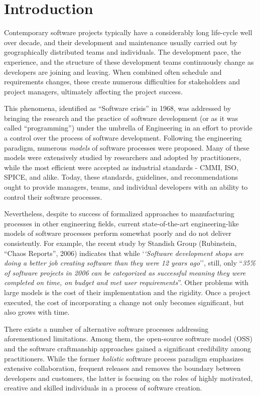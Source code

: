 \chapter{Introduction}
Contemporary software projects typically have a considerably long life-cycle well over decade, 
and their development and maintenance usually carried out by geographically distributed teams 
and individuals. The development pace, the experience, and the structure of these development 
teams continuously change as developers are joining and leaving. When combined 
often schedule and requirements changes, these create numerous difficulties for stakeholders
and project managers, ultimately affecting the project success. 

This phenomena, identified as ``Software crisis'' in 1968, was addressed by 
bringing the research and the practice of software development (or as it was called ``programming'') under the umbrella 
of Engineering in an effort to provide a control over the process of software development. 
Following the engineering paradigm, numerous \textit{models} of software processes were proposed.
Many of these models were extensively studied by researchers and adopted by practitioners, 
while the most efficient were accepted as industrial standards - CMMI, ISO, SPICE, and alike.
Today, these standards, guidelines, and recommendations ought to provide managers, teams, 
and individual developers with an ability to control their software processes.

Nevertheless, despite to success of formalized approaches to manufacturing processes in other engineering
fields, current state-of-the-art engineering-like models of software processes perform somewhat poorly and do not 
deliver consistently. 
For example, the recent study by Standish Group (Rubinstein, ``Chaos Reports'', 2006) indicates that 
while `\textit{`Software development shops are doing a better job creating software than they were 
12 years ago}'', still, only ``\textit{35\% of software projects in 2006 can be categorized 
as successful meaning they were completed on time, on budget and met user requirements}”.
Other problems with large models is the cost of their implementation and the rigidity. 
Once a project executed, the cost of incorporating a change not only becomes significant, 
but also grows with time.

There exists a number of alternative software processes addressing aforementioned limitations. 
Among them, the open-source software model (OSS) and the software craftmanship approaches gained a 
significant credibility among practitioners.
While the former \textit{holistic} software process paradigm emphasizes extensive collaboration, frequent releases 
and removes the boundary between developers and customers, the latter is focusing on the roles 
of highly motivated, creative and skilled individuals in a process of software creation. 

